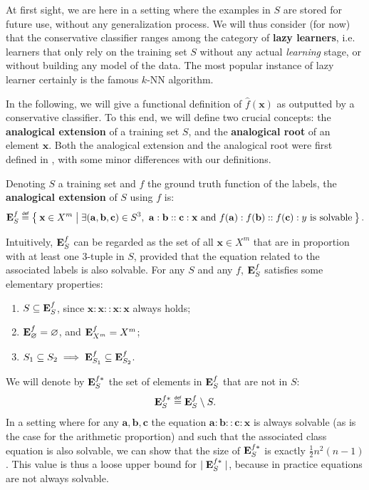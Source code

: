 At first sight, we are here in a setting where the examples in $S$ are stored
for future use, without any generalization process.  We will thus consider (for
now) that the conservative classifier ranges among the category of
\textbf{lazy learners}, i.e. learners that only rely on the training set $S$
without any actual \textit{learning} stage, or without building any model of
the data. The most popular instance of lazy learner certainly is the famous
$k$-NN algorithm.

In the following, we will give a functional definition of $\hat{f}(\mathbf{x})$
as outputted by a conservative classifier. To this end, we will define two
crucial concepts: the \textbf{analogical extension} of a training set $S$, and
the \textbf{analogical root} of an element $\mathbf{x}$. Both the analogical
extension and the analogical root were first defined in \cite{StrYvoREPORT05},
with some minor differences with our definitions.

\begin{definition}
  \label{DEF:analogical_extension}
  Denoting $S$ a training set and $f$ the ground truth function of the labels,
  the \textbf{analogical extension} of $S$ using $f$ is:
  $$
  \esf \eqdef \Set{ \mathbf{x} \in X^m |  \exists
  (\mathbf{a},\mathbf{b},\mathbf{c}) \in S^3, ~ \mathbf{a} : \mathbf{b} ::
  \mathbf{c} : \mathbf{x} \text{ and } f(\mathbf{a}) : f(\mathbf{b}) ::
  f(\mathbf{c}) : y \text{ is solvable}}.
  $$
\end{definition}

Intuitively,  $\mathbf{E}_{S}^{f}$ can be regarded as the set of all $\mathbf{x} \in X^m$
that are in proportion with at least one 3-tuple in $S$, provided that the
equation related to the associated labels is also solvable. For any $S$ and any
$f$, $\mathbf{E}_{S}^{f}$ satisfies some elementary properties:
\begin{enumerate}
\item $S \subseteq \mathbf{E}_{S}^{f}$, since $\mathbf{x} : \mathbf{x} :: \mathbf{x}
  :\mathbf{x}$ always holds;
\item $\mathbf{E}_{\varnothing}^{f} = \varnothing$, and $\mathbf{E}_{X^m}^{f}=X^m$;
\item $S_1 \subseteq S_2 \implies \mathbf{E}_{S_1}^{f} \subseteq \mathbf{E}_{S_2}^{f}$.
\end{enumerate}
We will denote by $\mathbf{E}_{S}^{f*}$ the set of elements in $\mathbf{E}_{S}^{f}$ that are not in $S$:
$$\esfs \eqdef \esf \setminus S.$$ In a setting where for any
$\mathbf{a},\mathbf{b}, \mathbf{c}$ the equation $\mathbf{a} : \mathbf{b} ::
\mathbf{c} : \mathbf{x}$ is always solvable (as is the case for the arithmetic
proportion) and such that the associated class equation is also solvable, we
can show that the size of $\mathbf{E}_{S}^{f*}$ is exactly $\frac{1}{2} n^2(n - 1)$. This
value is thus a loose upper bound for $\mid \mathbf{E}_{S}^{f*}\mid$, because in practice
equations are not always solvable.

